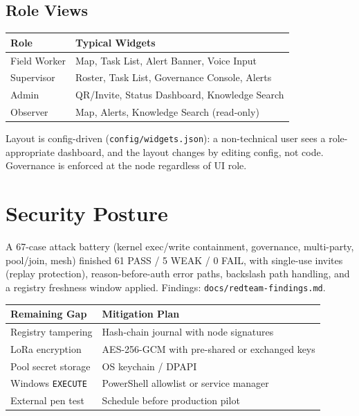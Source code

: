 \documentclass[11pt,a4paper]{article}
\begin{document}
\subsection{Role Views}
\begin{center}
\begin{tabularx}{\textwidth}{l X}
\toprule
\textbf{Role} & \textbf{Typical Widgets} \\
\midrule
Field Worker & Map, Task List, Alert Banner, Voice Input \\
Supervisor & Roster, Task List, Governance Console, Alerts \\
Admin & QR/Invite, Status Dashboard, Knowledge Search \\
Observer & Map, Alerts, Knowledge Search (read-only) \\
\bottomrule
\end{tabularx}
\end{center}

Layout is config-driven (\texttt{config/widgets.json}): a non-technical user sees a role-appropriate dashboard, and the layout changes by editing config, not code. Governance is enforced at the node regardless of UI role.

\section{Security Posture}
\label{sec:security}
A 67-case attack battery (kernel exec/write containment, governance, multi-party, pool/join, mesh) finished 61 PASS / 5 WEAK / 0 FAIL, with single-use invites (replay protection), reason-before-auth error paths, backslash path handling, and a registry freshness window applied. Findings: \texttt{docs/redteam-findings.md}.

\begin{center}
\begin{tabularx}{\textwidth}{l X}
\toprule
\textbf{Remaining Gap} & \textbf{Mitigation Plan} \\
\midrule
Registry tampering & Hash-chain journal with node signatures \\
LoRa encryption & AES-256-GCM with pre-shared or exchanged keys \\
Pool secret storage & OS keychain / DPAPI \\
Windows \texttt{EXECUTE} & PowerShell allowlist or service manager \\
External pen test & Schedule before production pilot \\
\bottomrule
\end{tabularx}
\end{center}
\end{document}
